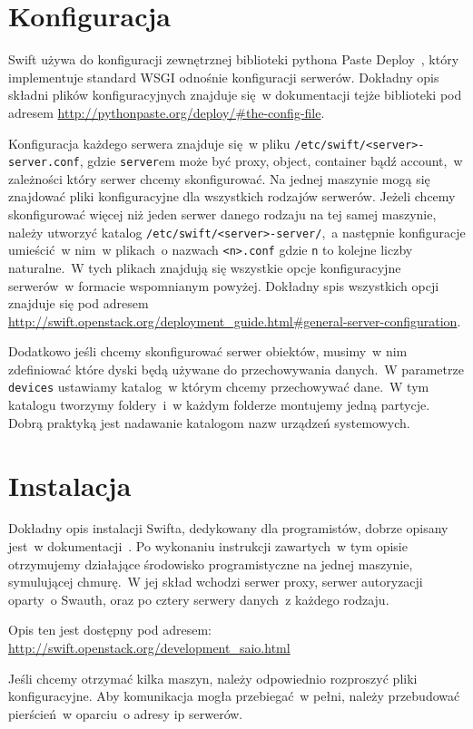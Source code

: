 \section{Konfiguracja}\label{sec:konfiguracja}

Swift używa do konfiguracji zewnętrznej biblioteki pythona Paste Deploy~\cite{paste_deploy}, który implementuje standard WSGI odnośnie konfiguracji serwerów. Dokładny opis składni plików konfiguracyjnych znajduje się~w dokumentacji tejże biblioteki pod adresem \url{http://pythonpaste.org/deploy/#the-config-file}. 

Konfiguracja każdego serwera znajduje się~w pliku \texttt{/etc/swift/<server>-server.conf}, gdzie \texttt{server}em może być proxy, object, container bądź account,~w zależności który serwer chcemy skonfigurować. Na jednej maszynie mogą się znajdować pliki konfiguracyjne dla wszystkich rodzajów serwerów. Jeżeli chcemy skonfigurować więcej niż jeden serwer danego rodzaju na tej samej maszynie, należy utworzyć katalog \texttt{/etc/swift/<server>-server/},~a następnie konfiguracje umieścić~w nim~w plikach~o nazwach \texttt{<n>.conf} gdzie \texttt{n} to kolejne liczby naturalne.~W tych plikach znajdują się wszystkie opcje konfiguracyjne serwerów~w formacie wspomnianym powyżej. Dokładny spis wszystkich opcji znajduje się pod adresem \url{http://swift.openstack.org/deployment_guide.html#general-server-configuration}.

Dodatkowo jeśli chcemy skonfigurować serwer obiektów, musimy~w nim zdefiniować które dyski będą używane do przechowywania danych.~W parametrze \texttt{devices} ustawiamy katalog~w którym chcemy przechowywać dane.~W tym katalogu tworzymy foldery~i~w każdym folderze montujemy jedną partycje. Dobrą praktyką jest nadawanie katalogom nazw urządzeń systemowych.

\section{Instalacja}\label{sec:instalacja}

Dokładny opis instalacji Swifta, dedykowany dla programistów, dobrze opisany jest~w dokumentacji~\cite{swift_doc}. Po wykonaniu instrukcji zawartych~w tym opisie otrzymujemy działające środowisko programistyczne na jednej maszynie, symulującej chmurę.~W jej skład wchodzi serwer proxy, serwer autoryzacji oparty~o Swauth, oraz po cztery serwery danych~z każdego rodzaju.

Opis ten jest dostępny pod adresem: \url{http://swift.openstack.org/development_saio.html}

Jeśli chcemy otrzymać kilka maszyn, należy odpowiednio rozproszyć pliki konfiguracyjne. Aby komunikacja mogła przebiegać~w pełni, należy przebudować pierścień~w oparciu~o adresy ip serwerów.



	

